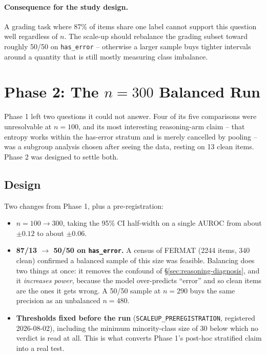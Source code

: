 \documentclass[11pt]{article}
\begin{document}
\paragraph{Consequence for the study design.} A grading task where 87\% of
items share one label cannot support this question well regardless of $n$.
The scale-up should rebalance the grading subset toward roughly 50/50 on
\verb|has_error| -- otherwise a larger sample buys tighter intervals around a
quantity that is still mostly measuring class imbalance.

\section{Phase 2: The $n=300$ Balanced Run}
\label{sec:scaleup}

Phase 1 left two questions it could not answer. Four of its five comparisons
were unresolvable at $n=100$, and its most interesting reasoning-arm claim --
that entropy works within the has-error stratum and is merely cancelled by
pooling -- was a subgroup analysis chosen after seeing the data, resting on 13
clean items. Phase 2 was designed to settle both.

\subsection{Design}

Two changes from Phase 1, plus a pre-registration:

\begin{itemize}
  \item \textbf{$n=100 \rightarrow 300$}, taking the 95\% CI half-width on a
    single AUROC from about $\pm 0.12$ to about $\pm 0.06$.
  \item \textbf{87/13 $\rightarrow$ 50/50 on \texttt{has\_error}.} A census of
    FERMAT (2244 items, 340 clean) confirmed a balanced sample of this size was
    feasible. Balancing does two things at once: it removes the confound of
    \S\ref{sec:reasoning-diagnosis}, and it \emph{increases power}, because the
    model over-predicts ``error'' and so clean items are the ones it gets wrong.
    A 50/50 sample at $n=290$ buys the same precision as an unbalanced $n=480$.
  \item \textbf{Thresholds fixed before the run}
    (\texttt{SCALEUP\_PREREGISTRATION}, registered 2026-08-02), including the
    minimum minority-class size of 30 below which no verdict is read at all.
    This is what converts Phase 1's post-hoc stratified claim into a real test.
\end{itemize}
\end{document}
